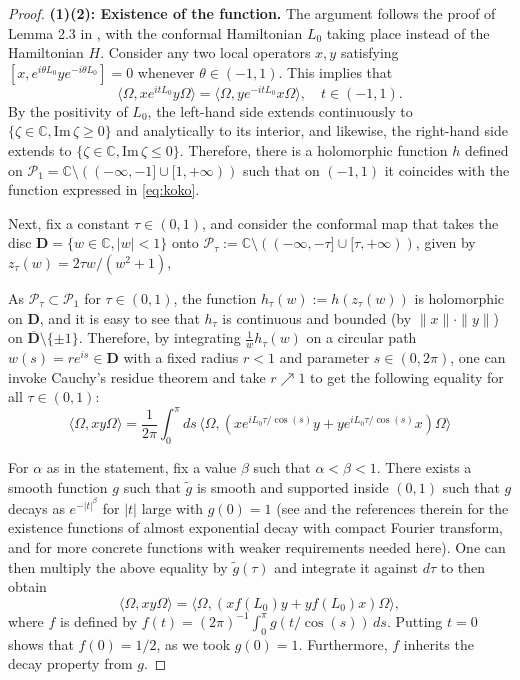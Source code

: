 \documentclass[a4paper,12pt]{article}
\theoremstyle{plain}
\theoremstyle{definition}
\theoremstyle{remark}
\newcommand{\inner}  [2]{\langle #1 , #2 \rangle}
\newcommand{\binner} [2]{\big\langle #1 , #2 \big\rangle}
\newcommand{\im}{\mathrm{Im}\,}
\begin{document}
\begin{proof}
{\bf (1)(2): Existence of the function.}
The argument follows the proof of Lemma 2.3 in \cite{bdf87},
with the conformal Hamiltonian $L_0$ taking place instead of the Hamiltonian $H$.
Consider any two local operators $x,y$ satisfying $[x, e^{i\theta L_0}ye^{-i\theta L_0}] = 0$ whenever $\theta \in (-1,1)$. This implies that
\begin{equation}\label{eq:koko}
\inner{\Omega}{x e^{itL_0} y \Omega} = \inner{\Omega}{y e^{-itL_0} x \Omega}, \quad  t\in (-1,1).
\end{equation}
By the positivity of $L_0$, the left-hand side extends continuously to $\{\zeta \in \mathbb{C}, \im \zeta \ge 0\}$
and analytically to its interior, and likewise,
the right-hand side extends to $\{\zeta \in \mathbb{C}, \im \zeta \le 0 \}$.
Therefore, there is a holomorphic function $h$ defined on $\mathcal{P}_1 = \mathbb{C}\setminus\left( (-\infty,-1]\cup[1,+\infty)\right)$
such that on $(-1,1)$ it coincides with the function expressed in \eqref{eq:koko}.


Next, fix a constant $\tau \in (0,1)$, and consider the conformal map that takes the disc $\mathbf{D} = \{ w\in\mathbb{C}, |w|<1 \}$
onto $\mathcal{P}_\tau := \mathbb{C}\setminus\left( (-\infty,-\tau]\cup[\tau,+\infty)\right)$, given by $z_\tau(w) = 2\tau w/(w^2 +1)$,

As $\mathcal{P}_\tau \subset \mathcal{P}_1$ for $\tau \in (0,1)$,
the function $h_\tau(w) := h(z_\tau(w))$ is holomorphic on $\mathbf{D}$,
and it is easy to see that $h_\tau$ is continuous and bounded (by $\|x\|\cdot\|y\|$)
on $\overline{\mathbf{D}}\setminus \{\pm 1 \}$. Therefore, by integrating $\frac1 w h_\tau(w)$ on a circular path $w(s) = re^{is} \in \mathbf{D}$
with a fixed radius $r<1$ and parameter $s \in (0,2\pi)$, one can invoke Cauchy's residue theorem and take $r \nearrow 1$ to get the following equality for all $\tau \in (0,1)$:
\begin{equation}\label{eq:pwpw}
\inner{\Omega}{xy\Omega} = \frac{1}{2\pi}\int_{0}^{\pi}ds\,\binner{\Omega}{(xe^{iL_0\tau/\cos(s)}y + ye^{iL_0\tau/\cos(s)}x) \Omega}
\end{equation}

For $\alpha$ as in the statement, fix a value $\beta$ such that $\alpha < \beta < 1$.
There exists a smooth function $g$ such that $\tilde{g}$ is smooth and supported inside $(0,1)$ such that
$g$ decays as $e^{-|t|^{\beta}}$ for $|t|$ large with $g(0) = 1$
(see \cite{jaffe67} and the references therein
for the existence functions of almost exponential decay with compact Fourier transform,
and \cite{johnson15} for more concrete functions with weaker requirements needed here).
One can then multiply the above equality by $\tilde{g}(\tau)$ and integrate it against $d\tau$ to then obtain
\begin{equation*}%
\inner{\Omega}{xy\Omega} = \binner{\Omega}{(xf(L_0)y + yf(L_0)x) \Omega}, 
\end{equation*}
where $f$ is defined by $f(t) = (2\pi)^{-1} \int_{0}^{\pi} g\left(t/\cos(s)\right)\,ds$.
Putting $t = 0$ shows that $f(0) = 1/2$, as we took $g(0) = 1$. Furthermore, $f$ inherits the decay property from $g$.


\end{proof}
\end{document}

